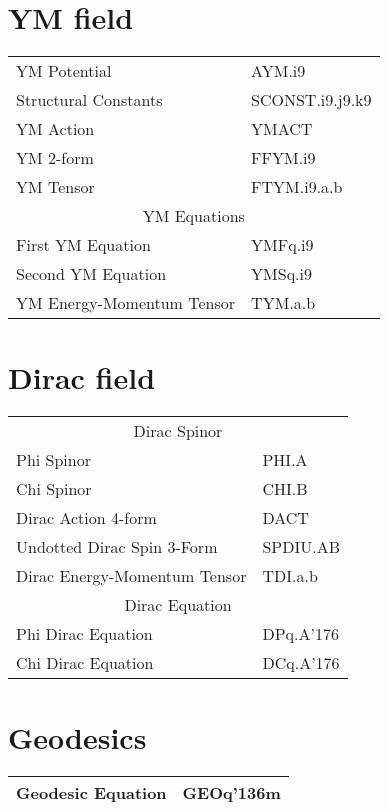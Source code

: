 \documentclass[twoside,openright]{report}
\newcommand{\grgtt}{\ttfamily}
\renewcommand{\tt}{\grgtt}
\def\^{{\tt \char'136}}                     %
\newcommand{\cc}{{\tt \char'176}}           %
\begin{document}
\begin{center}
\section{YM field}
\begin{tabular}{|l|l|}\hline
\tt    YM Potential         &\tt  AYM.i9\\
\tt    Structural Constants &\tt  SCONST.i9.j9.k9\\
\tt    YM Action            &\tt  YMACT\\
\tt    YM 2-form          &\tt  FFYM.i9\\
\tt    YM Tensor          &\tt   FTYM.i9.a.b\\
\hline
\multicolumn{2}{|c|}{\tt    YM Equations}\\
\tt    First YM Equation  &\tt   YMFq.i9\\
\tt    Second YM Equation &\tt   YMSq.i9\\
\hline
\tt    YM Energy-Momentum Tensor &\tt  TYM.a.b\\
\hline\end{tabular}

\section{Dirac field}
\begin{tabular}{|l|l|}\hline
\multicolumn{2}{|c|}{\tt    Dirac Spinor}\\
\tt    Phi Spinor   &\tt   PHI.A\\
\tt    Chi Spinor   &\tt   CHI.B\\
\hline
\tt    Dirac Action 4-form &\tt  DACT\\
\tt    Undotted Dirac Spin 3-Form &\tt  SPDIU.AB\\
\tt    Dirac Energy-Momentum Tensor &\tt  TDI.a.b\\
\hline
\multicolumn{2}{|c|}{\tt    Dirac Equation}\\
\tt    Phi Dirac Equation  &\tt   DPq.A\cc\\
\tt    Chi Dirac Equation  &\tt   DCq.A\cc\\
\hline\end{tabular}

\section{Geodesics}
\begin{tabular}{|l|l|}\hline
\tt    Geodesic Equation  &\tt   GEOq\^m\\
\hline\end{tabular}


\end{center}
\end{document}
